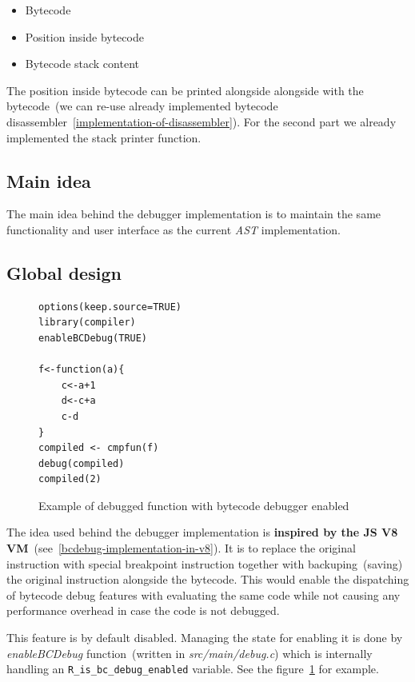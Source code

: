\documentclass[thesis=M,english]{FITthesis}[2018/10/20]
\newcommand{\code}[1]{\texttt{#1}}
\begin{document}
\begin{itemize}
	\item Bytecode
	\item Position inside bytecode
	\item Bytecode stack content
\end{itemize}

The position inside bytecode can be printed alongside alongside with the bytecode~(we can re-use already implemented bytecode disassembler~\ref{implementation-of-disassembler}). For the second part we already implemented the stack printer function.

\subsection{Main idea}

The main idea behind the debugger implementation is to maintain the same functionality and user interface as the current \textit{AST} implementation.

\subsection{Global design}

\begin{figure}[h]
\begin{lstlisting}
options(keep.source=TRUE)
library(compiler)
enableBCDebug(TRUE)

f<-function(a){
    c<-a+1
    d<-c+a
    c-d
}
compiled <- cmpfun(f)
debug(compiled)
compiled(2)
\end{lstlisting}
	\caption{Example of debugged function with bytecode debugger enabled}\label{fig:debugged-bcdebug-enabled}
\end{figure}

The idea used behind the debugger implementation is \textbf{inspired by the JS V8 VM}~(see~\ref{bcdebug-implementation-in-v8}). It is to replace the original instruction with special breakpoint instruction together with backuping~(saving) the original instruction alongside the bytecode. This would enable the dispatching of bytecode debug features with evaluating the same code while not causing any performance overhead in case the code is not debugged.

This feature is by default disabled. Managing the state for enabling it is done by \textit{enableBCDebug} function~(written in \textit{src/main/debug.c}) which is internally handling an \code{R{\_}is{\_}bc{\_}debug{\_}enabled} variable. See the figure~\ref{fig:debugged-bcdebug-enabled} for example.
\end{document}
